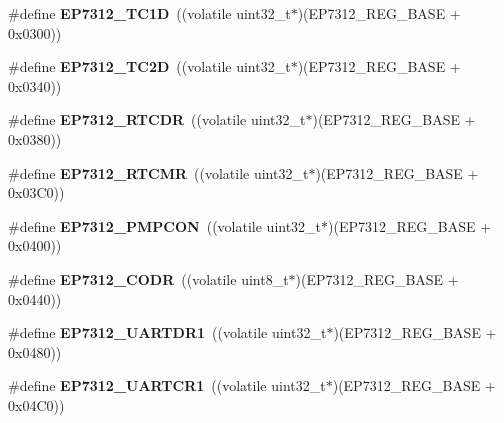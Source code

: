 \begin{DoxyCompactItemize}
\#define {\bfseries E\+P7312\+\_\+\+T\+C1D}~((volatile uint32\+\_\+t$\ast$)(E\+P7312\+\_\+\+R\+E\+G\+\_\+\+B\+A\+SE + 0x0300))
\item 
\mbox{\label{group__edb7312__registers_gad80274e4e10ae3131d70b40f18fd894e}} 
\#define {\bfseries E\+P7312\+\_\+\+T\+C2D}~((volatile uint32\+\_\+t$\ast$)(E\+P7312\+\_\+\+R\+E\+G\+\_\+\+B\+A\+SE + 0x0340))
\item 
\mbox{\label{group__edb7312__registers_ga816609d694f751a5281155c2135dc7ce}} 
\#define {\bfseries E\+P7312\+\_\+\+R\+T\+C\+DR}~((volatile uint32\+\_\+t$\ast$)(E\+P7312\+\_\+\+R\+E\+G\+\_\+\+B\+A\+SE + 0x0380))
\item 
\mbox{\label{group__edb7312__registers_ga5450007e81fa7563d244748525b708b0}} 
\#define {\bfseries E\+P7312\+\_\+\+R\+T\+C\+MR}~((volatile uint32\+\_\+t$\ast$)(E\+P7312\+\_\+\+R\+E\+G\+\_\+\+B\+A\+SE + 0x03\+C0))
\item 
\mbox{\label{group__edb7312__registers_ga9a0db61c6b1009841a96404ae0fd9c90}} 
\#define {\bfseries E\+P7312\+\_\+\+P\+M\+P\+C\+ON}~((volatile uint32\+\_\+t$\ast$)(E\+P7312\+\_\+\+R\+E\+G\+\_\+\+B\+A\+SE + 0x0400))
\item 
\mbox{\label{group__edb7312__registers_ga1f7a50629511a8fef40c4e860b6359dc}} 
\#define {\bfseries E\+P7312\+\_\+\+C\+O\+DR}~((volatile uint8\+\_\+t$\ast$)(E\+P7312\+\_\+\+R\+E\+G\+\_\+\+B\+A\+SE + 0x0440))
\item 
\mbox{\label{group__edb7312__registers_ga9dc4abd94a47db43b684ea77e05181ef}} 
\#define {\bfseries E\+P7312\+\_\+\+U\+A\+R\+T\+D\+R1}~((volatile uint32\+\_\+t$\ast$)(E\+P7312\+\_\+\+R\+E\+G\+\_\+\+B\+A\+SE + 0x0480))
\item 
\mbox{\label{group__edb7312__registers_ga8b4881805d1869bd0a76e7c08bc857b6}} 
\#define {\bfseries E\+P7312\+\_\+\+U\+A\+R\+T\+C\+R1}~((volatile uint32\+\_\+t$\ast$)(E\+P7312\+\_\+\+R\+E\+G\+\_\+\+B\+A\+SE + 0x04\+C0))
\item 
\mbox{\label{group__edb7312__registers_gaf489222fd69734d4ed85dcbc36cfee7e}} 

\end{DoxyCompactItemize}
